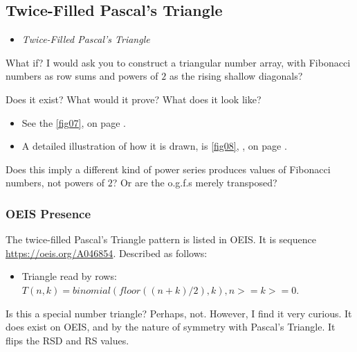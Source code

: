 \documentclass[12pt]{article}
\begin{document}
     
    \subsection{Twice-Filled Pascal's Triangle}
    \label{sec:14}

    \begin{itemize}
        \item \textit{Twice-Filled Pascal's Triangle}
    \end{itemize}
    
    What if? I would ask you to construct a triangular number array, with Fibonacci numbers as 
    row sums and powers of $ 2 $ as the rising shallow diagonals?
    
    Does it exist? What would it prove? What does it look like?
    
    \begin{itemize}
        \item See the \cref{fig07},  on page \pageref{fig07}. 
        \item A detailed illustration of how it is drawn, is \cref{fig08}, , on 
        page \pageref{fig08}.
    \end{itemize}
    
    Does this imply a different kind of power series produces values of Fibonacci numbers, 
    not powers of $ 2 $? Or are the o.g.f.s merely transposed?

        \subsubsection{OEIS Presence}
        \label{secb:14}
        
        The twice-filled Pascal's Triangle pattern is listed in OEIS. It is sequence 
        \url{https://oeis.org/A046854}. Described as follows:
        
        \begin{itemize}
            \item Triangle read by rows: $ T(n, k) = binomial( floor( (n+k) / 2), k), 
            n >= k >= 0 $.
        \end{itemize}
        
        Is this a special number triangle? Perhaps, not. However, I find it very curious. It does 
        exist on OEIS, and by the nature of symmetry with Pascal's Triangle. It flips the RSD and 
        RS values.
\end{document}
